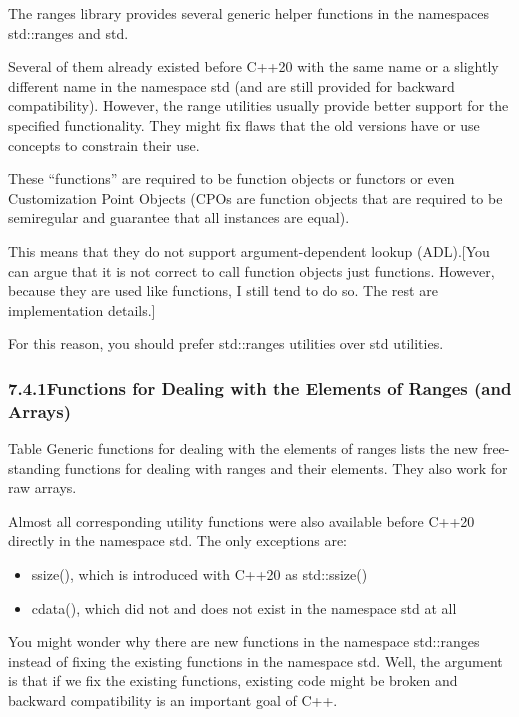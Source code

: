 
The ranges library provides several generic helper functions in the namespaces std::ranges and std.

Several of them already existed before C++20 with the same name or a slightly different name in the namespace std (and are still provided for backward compatibility). However, the range utilities usually provide better support for the specified functionality. They might fix flaws that the old versions have or use concepts to constrain their use.

These “functions” are required to be function objects or functors or even Customization Point Objects (CPOs are function objects that are required to be semiregular and guarantee that all instances are equal).

This means that they do not support argument-dependent lookup (ADL).[You can argue that it is not correct to call function objects just functions. However, because they are used like functions, I still tend to do so. The rest are implementation details.]

For this reason, you should prefer std::ranges utilities over std utilities.

\subsubsection*{ 7.4.1\hspace{0.2cm}Functions for Dealing with the Elements of Ranges (and Arrays)}

Table Generic functions for dealing with the elements of ranges lists the new free-standing functions for dealing with ranges and their elements. They also work for raw arrays.

Almost all corresponding utility functions were also available before C++20 directly in the namespace std. The only exceptions are:

\begin{itemize}
\item
ssize(), which is introduced with C++20 as std::ssize()

\item
cdata(), which did not and does not exist in the namespace std at all
\end{itemize}

You might wonder why there are new functions in the namespace std::ranges instead of fixing the existing functions in the namespace std. Well, the argument is that if we fix the existing functions, existing code might be broken and backward compatibility is an important goal of C++.


